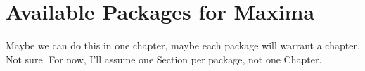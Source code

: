 \documentclass[oneside,english]{book}
\begin{document}
\chapter{Available Packages for Maxima}

    Maybe we can do this in one chapter, maybe each package will warrant
    a chapter. Not sure. For now, I'll assume one Section per package,
    not one Chapter.

\listoffigures


\printindex



\nocite{*}
\end{document}
